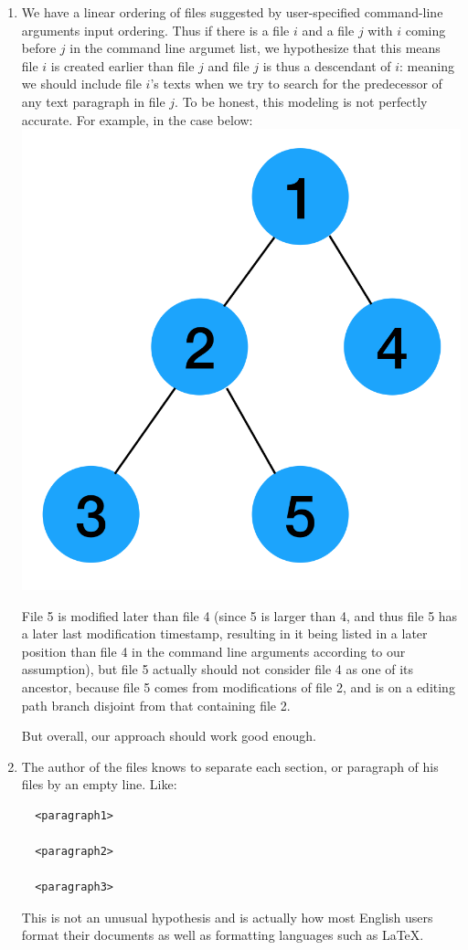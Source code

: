 \documentclass{article}
\begin{document}
\begin{enumerate}
  \item We have a linear ordering of files suggested by user-specified command-line arguments input ordering. Thus if there is a file $i$ and a file $j$ with $i$ coming before $j$ in the command line argumet list, we hypothesize that this means file $i$ is created earlier than file $j$ and file $j$ is thus a descendant of $i$: meaning we should include file $i$'s texts when we try to search for the predecessor of any text paragraph in file $j$. To be honest, this modeling is not perfectly accurate. For example, in the case below:\\
  \includegraphics[scale=0.3,center]{pic1.png}

  File 5 is modified later than file 4 (since 5 is larger than 4, and thus file 5 has a later last modification timestamp, resulting in it being listed in a later position than file 4 in the command line arguments according to our assumption), but file 5 actually should not consider file 4 as one of its ancestor, because file 5 comes from modifications of file 2, and is on a editing path branch disjoint from that containing file 2. 

  But overall, our approach should work good enough. 
  \item The author of the files knows to separate each section, or paragraph of his files by an empty line. Like:
  \begin{lstlisting}
  <paragraph1>

  <paragraph2>

  <paragraph3>
  \end{lstlisting}
  This is not an unusual hypothesis and is actually how most English users format their documents as well as formatting languages such as LaTeX. 
\end{enumerate}
\end{document}
